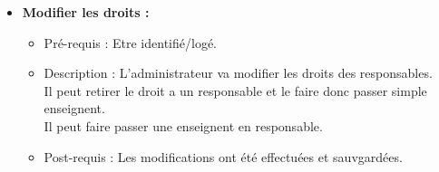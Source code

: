 \begin{itemize}
\item {\bf Modifier les droits :}
	\begin{itemize}
	\item Pr{\'e}-requis : Etre identifi{\'e}/log{\'e}. 
	\item Description : L'administrateur va modifier les droits des responsables.\\
	Il peut retirer le droit a un responsable et le faire donc passer simple enseignent.\\
	Il peut faire passer une enseignent en responsable.\\
	\item Post-requis : Les modifications ont {\'e}t{\'e} effectu{\'e}es et sauvgard{\'e}es.
	\end{itemize}
\end{itemize}
